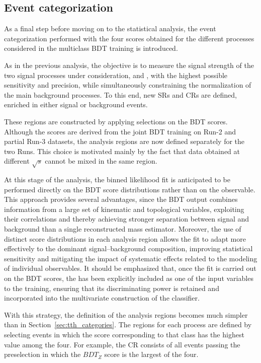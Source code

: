 \subsection{Event categorization}
\label{new_categorization}

As a final step before moving on to the statistical analysis, the event categorization performed with the four scores obtained for the different processes considered in the multiclass BDT training is introduced.

As in the previous analysis, the objective is to measure the signal strength of the two signal processes under consideration, \thtt and \ttHtt, with the highest possible sensitivity and precision, while simultaneously constraining the normalization of the main background processes. To this end, new SRs and CRs are defined, enriched in either signal or background events.

These regions are constructed by applying selections on the BDT scores. Although the scores are derived from the joint BDT training on Run-2 and partial Run-3 datasets, the analysis regions are now defined separately for the two Runs. This choice is motivated mainly by the fact that data obtained at different $\sqrt{s}$ cannot be mixed in the same region.

At this stage of the analysis, the binned likelihood fit is anticipated to be performed directly on the BDT score distributions rather than on the \mmc observable. This approach provides several advantages, since the BDT output combines information from a large set of kinematic and topological variables, exploiting their correlations and thereby achieving stronger separation between signal and background than a single reconstructed mass estimator. Moreover, the use of distinct score distributions in each analysis region allows the fit to adapt more effectively to the dominant signal–background composition, improving statistical sensitivity and mitigating the impact of systematic effects related to the modeling of individual observables. It should be emphasized that, once the fit is carried out on the BDT scores, the \mmc has been explicitly included as one of the input variables to the training, ensuring that its discriminating power is retained and incorporated into the multivariate construction of the classifier.

With this strategy, the definition of the analysis regions becomes much simpler than in Section~\ref{sec:tth_categories}. The regions for each process are defined by selecting events in which the score corresponding to that class has the highest value among the four. For example, the \ztautau CR consists of all events passing the preselection in which the $BDT_{Z}$ score is the largest of the four.

